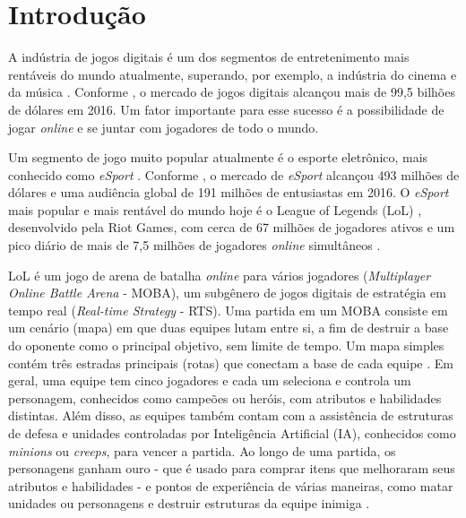 \chapter{Introdu\c{c}\~{a}o}

A indústria de jogos digitais é um dos segmentos de entretenimento mais rentáveis do mundo atualmente, superando, por exemplo, a indústria do cinema e da música \cite{newzoo1} \cite{ifpi1} \cite{mpaa1}. Conforme \cite{newzoo1}, o mercado de jogos digitais alcançou mais de 99,5 bilhões de dólares em 2016. Um fator importante para esse sucesso é a possibilidade de jogar \textit{online} e se juntar com jogadores de todo o mundo.

Um segmento de jogo muito popular atualmente é o esporte eletrônico, mais conhecido como \textit{eSport} \cite{forbes1}. Conforme \cite{newzoo2}, o mercado de \textit{eSport} alcançou 493 milhões de dólares e uma audiência global de 191 milhões de entusiastas em 2016. O \textit{eSport} mais popular e mais rentável do mundo hoje é o League of Legends (LoL)  \cite{superdata1}, desenvolvido pela Riot Games, com cerca de 67 milhões de jogadores ativos e um pico diário de mais de 7,5 milhões de jogadores \textit{online} simultâneos \cite{riot1}.

LoL é um jogo de arena de batalha \textit{online} para vários jogadores (\textit{Multiplayer Online Battle Arena} - MOBA), um subgênero de jogos digitais de estratégia em tempo real (\textit{Real-time Strategy} - RTS). Uma partida em um MOBA consiste em um cenário (mapa) em que duas equipes lutam entre si, a fim de destruir a base do oponente como o principal objetivo, sem limite de tempo. Um mapa simples contém três estradas principais (rotas) que conectam a base de cada equipe . Em geral, uma equipe tem cinco jogadores e cada um seleciona e controla um personagem, conhecidos como campeões ou heróis, com atributos e habilidades distintas. Além disso, as equipes também contam com a assistência de estruturas de defesa e unidades controladas por Inteligência Artificial (IA), conhecidos como \textit{minions} ou \textit{creeps}, para vencer a partida. Ao longo de uma partida, os personagens ganham ouro - que é usado para comprar itens que melhoraram seus atributos e habilidades - e pontos de experiência de várias maneiras, como matar unidades ou personagens e destruir estruturas da equipe inimiga \cite{league1}.

